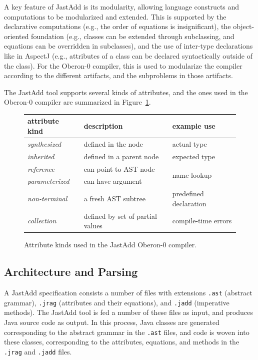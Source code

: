 A key feature of JastAdd is its modularity, allowing language constructs and computations to be modularized and extended. This is supported by the declarative computations (e.g., the order of equations is insignificant), the object-oriented foundation (e.g., classes can be extended through subclassing, and equations can be overridden in subclasses), and the use of inter-type declarations like in AspectJ \cite{kiczales01ecoop} (e.g., attributes of a class can be declared syntactically outside of the class).
For the Oberon-0 compiler, this is used to modularize the compiler according to the different artifacts, and the subproblems in those artifacts.

The JastAdd tool supports several kinds of attributes, and the ones used in the Oberon-0 compiler are summarized in Figure~\ref{JA-AttributeKinds}.

\begin{figure}
\begin{center}
\begin{tabular}{ | l c | l | l | }
  \hline             
  \multicolumn{2}{|l|}{\bf{attribute kind}} & \bf{description} & \bf{example use} \\
  \hline
  \hline          
  \emph{synthesized}& \multirow{2}{*}{\cite{knuth68mst}} & defined in the node & actual type \\
  \emph{inherited}& & defined in a parent node & expected type \\
  \hline 
  \emph{reference}& \multirow{2}{*}{\cite{hedin00informatica}}& can point to AST node & \multirow{2}{*}{name lookup}\\
  \emph{parameterized}& & can have argument & \\
  \hline
  \emph{non-terminal}& \cite{vogt89pldi}& a fresh AST subtree & predefined declaration \\
  \hline
  \emph{collection}& \cite{boyland98cc,magnusson09ase}& defined by set of partial values & compile-time errors \\
  \hline  
\end{tabular}
\caption{Attribute kinds used in the JastAdd Oberon-0 compiler.}
\label{JA-AttributeKinds}
\end{center}
\end{figure}


%
%
\subsection{Architecture and Parsing}
A JastAdd specification consists a number of files with extensions \texttt{.ast} (abstract grammar), \texttt{.jrag} (attributes and their equations), and \texttt{.jadd} (imperative methods). The JastAdd tool is fed a number of these files as input, and produces Java source code as output. In this process, Java classes are generated corresponding to the abstract grammar in the \texttt{.ast} files, and code is woven into these classes, corresponding to the attributes, equations, and methods in the \texttt{.jrag} and \texttt{.jadd} files.

